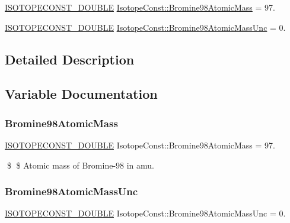 \begin{DoxyCompactItemize}
\item 
\mbox{\hyperlink{group___isotope_const-_macros_ga8f45a7272ce02c0b4c65c44636ed719a}{I\+S\+O\+T\+O\+P\+E\+C\+O\+N\+S\+T\+\_\+\+D\+O\+U\+B\+LE}} \mbox{\hyperlink{group___isotope_const-_bromine-_br98_ga9611a3a29ef8843e4ecdb031336d85a1}{Isotope\+Const\+::\+Bromine98\+Atomic\+Mass}} = 97.
\item 
\mbox{\hyperlink{group___isotope_const-_macros_ga8f45a7272ce02c0b4c65c44636ed719a}{I\+S\+O\+T\+O\+P\+E\+C\+O\+N\+S\+T\+\_\+\+D\+O\+U\+B\+LE}} \mbox{\hyperlink{group___isotope_const-_bromine-_br98_gab096ce39e1d915d3a75cb3cab449f558}{Isotope\+Const\+::\+Bromine98\+Atomic\+Mass\+Unc}} = 0.
\end{DoxyCompactItemize}


\subsection{Detailed Description}


\subsection{Variable Documentation}
\mbox{\label{group___isotope_const-_bromine-_br98_ga9611a3a29ef8843e4ecdb031336d85a1}} 
\subsubsection{\texorpdfstring{Bromine98\+Atomic\+Mass}{Bromine98AtomicMass}}
{\footnotesize\ttfamily \mbox{\hyperlink{group___isotope_const-_macros_ga8f45a7272ce02c0b4c65c44636ed719a}{I\+S\+O\+T\+O\+P\+E\+C\+O\+N\+S\+T\+\_\+\+D\+O\+U\+B\+LE}} Isotope\+Const\+::\+Bromine98\+Atomic\+Mass = 97.}

\$ \$ Atomic mass of Bromine-\/98 in amu. \mbox{\label{group___isotope_const-_bromine-_br98_gab096ce39e1d915d3a75cb3cab449f558}} 
\subsubsection{\texorpdfstring{Bromine98\+Atomic\+Mass\+Unc}{Bromine98AtomicMassUnc}}
{\footnotesize\ttfamily \mbox{\hyperlink{group___isotope_const-_macros_ga8f45a7272ce02c0b4c65c44636ed719a}{I\+S\+O\+T\+O\+P\+E\+C\+O\+N\+S\+T\+\_\+\+D\+O\+U\+B\+LE}} Isotope\+Const\+::\+Bromine98\+Atomic\+Mass\+Unc = 0.}

